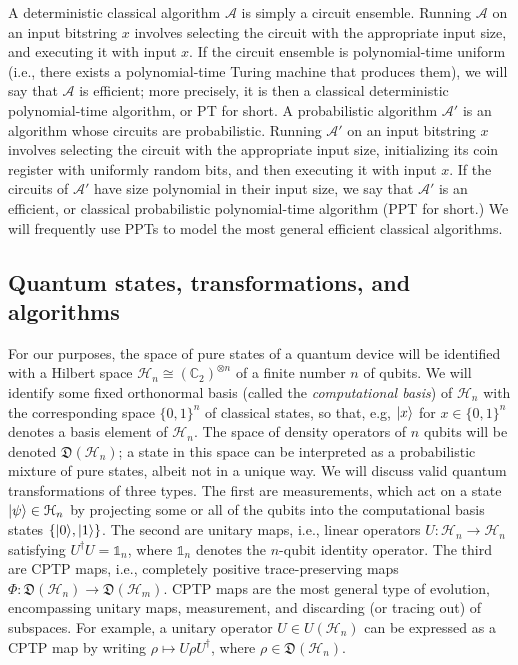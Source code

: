 \documentclass[11pt]{article}
\numberwithin{equation}{section}
\newcommand{\one}{\mathds 1}
\newcommand{\C}{\mathbb{C}}
\newcommand{\algo}{\mathcal}
\newcommand{\states}{\mathfrak D}
\begin{document}
{A deterministic classical algorithm $\algo A$ is simply a circuit ensemble. Running $\algo A$ on an input bitstring $x$ involves selecting the circuit with the appropriate input size, and executing it with input $x$. If the circuit ensemble is polynomial-time uniform (i.e., there exists a polynomial-time Turing machine that produces them), we will say that $\algo A$ is efficient; more precisely, it is then a classical deterministic polynomial-time algorithm, or PT for short. A probabilistic algorithm $\algo A'$ is an algorithm whose circuits are probabilistic. Running $\algo A'$ on an input bitstring $x$ involves selecting the circuit with the appropriate input size, initializing its coin register with uniformly random bits, and then executing it with input $x$. If the circuits of $\algo A'$ have size polynomial in their input size, we say that $\algo A'$ is an efficient, or classical probabilistic polynomial-time algorithm (PPT for short.) We will frequently use PPTs to model the most general efficient classical algorithms.

\subsection{Quantum states, transformations, and algorithms}

For our purposes, the space of pure states of a quantum device will be identified with a Hilbert space $\mathcal H_n \cong (\C_2)^{\otimes n}$ of a finite number $n$ of qubits. We will identify some fixed orthonormal basis (called the \emph{computational basis}) of $\mathcal H_n$ with the corresponding space $\{0, 1\}^n$ of classical states, so that, e.g, ${\left\vert{x}\right\rangle}$ for $x \in \{0, 1\}^n$ denotes a basis element of $\mathcal H_n$. The space of density operators of $n$ qubits will be denoted $\states (\mathcal H_n)$; a state in this space can be interpreted as a probabilistic mixture of pure states, albeit not in a unique way. We will discuss valid quantum transformations of three types. The first are measurements, which act on a state ${\left\vert{\psi}\right\rangle} \in \mathcal H_n$ by projecting some or all of the qubits into the computational basis states $\{{\left\vert{0}\right\rangle}, {\left\vert{1}\right\rangle}\}$. The second are unitary maps, i.e., linear operators $U: \mathcal H_n \rightarrow \mathcal H_n$ satisfying $U^\dagger U = \one_n$, where $\one_n$ denotes the $n$-qubit identity operator. The third are CPTP maps, i.e., completely positive trace-preserving maps $\Phi : \states (\mathcal H_n) \rightarrow \states (\mathcal H_m)$. CPTP maps are the most general type of evolution, encompassing unitary maps, measurement, and discarding (or tracing out) of subspaces. For example, a unitary operator $U \in U(\mathcal H_n)$ can be expressed as a CPTP map by writing $\rho \mapsto U\rho U^\dagger$, where $\rho \in \states (\mathcal H_n)$.

}
\end{document}

